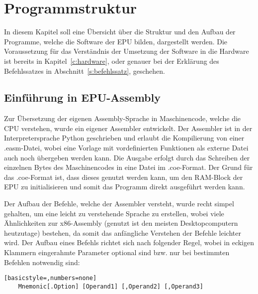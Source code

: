 \captionsetup[figure]{justification=justified,singlelinecheck=false}
\chapter{Programmstruktur}
In diesem Kapitel soll eine Übersicht über die Struktur und den Aufbau der
Programme, welche die Software der EPU bilden, dargestellt werden. Die
Voraussetzung für das Verständnis der Umsetzung der Software in die Hardware
ist bereits in Kapitel~\ref{c:hardware}, oder genauer bei der Erklärung des
Befehlssatzes in Abschnitt~\ref{s:befehlssatz}, geschehen.
\section{Einführung in EPU-Assembly}
Zur Übersetzung der eigenen Assembly-Sprache in Maschinencode, welche die CPU
verstehen, wurde ein eigener Assembler entwickelt. Der Assembler ist in  der
Interpretersprache Python geschrieben und erlaubt die Kompilierung von einer
.easm-Datei, wobei eine Vorlage mit vordefinierten Funktionen als externe Datei
auch noch übergeben werden kann. Die Ausgabe erfolgt durch das Schreiben der
einzelnen Bytes des Maschinencodes in eine Datei im .coe-Format. Der Grund für
das .coe-Format ist, dass dieses genutzt werden kann, um den RAM-Block der EPU
zu initialisieren und somit das Programm direkt ausgeführt werden kann.

Der Aufbau der Befehle, welche der Assembler versteht, wurde recht simpel
gehalten, um eine leicht zu verstehende Sprache zu erstellen, wobei viele
Ähnlichkeiten zur x86-Assembly (genutzt ist den meisten Desktopcomputern
heutzutage) bestehen, da somit das anfängliche Verstehen der Befehle leichter
wird. Der Aufbau eines Befehls richtet sich nach folgender Regel, wobei in
eckigen Klammern eingerahmte Parameter optional sind bzw. nur bei bestimmten
Befehlen notwendig sind:
\begin{lstlisting}[basicstyle=,numbers=none]
	Mnemonic[.Option] [Operand1] [,Operand2] [,Operand3]
\end{lstlisting}

